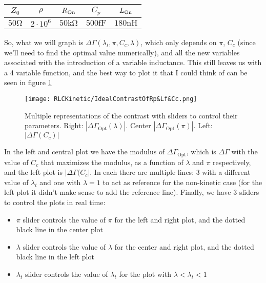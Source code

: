 \documentclass[../main.tex]{subfiles}
\begin{document}
\begin{table}[H]
    \centering
    \begin{tabular}{c|c|c|c|c}
        \(Z_{0}\) & \(\rho\) & \(R_{\text{On}}\) & \(C_{p}\) & \(L_{\text{On}}\) \\\hline
        \(50\unit{\ohm}\) & \(2\cdot10^{6}\) & \(50\unit{\kilo\ohm}\) & \(500\unit{\femto\farad}\) & \(180\unit{\nano\henry}\)
    \end{tabular}
\end{table}

So, what we will graph is \(\Delta\Gamma(\lambda_{t}, \pi, C_{c}, \lambda)\),
which only depends on \(\pi\), \(C_{c}\) (since we'll need to find the optimal
value numerically), and all the new variables associated with the introduction
of a variable inductance. This still leaves us with a 4 variable function, and
the best way to plot it that I could think of can be seen in figure
\ref{fig:IdealContrast}

\begin{figure}[t]
\centering
  \texttt{[image: RLCKinetic/IdealContrastOfRp\&Lf\&Cc.png]}
  \caption{Multiple representations of the contrast with sliders to control
  their parameters. Right: \(|\Delta\Gamma_{\text{Opt}}(\lambda)|\).
  Center \(|\Delta\Gamma_{\text{Opt}}(\pi)|\). Left: \(|\Delta\Gamma(C_{c})|\)}
\label{fig:IdealContrast}
\end{figure}

In the left and central plot we have the modulus of \(\Delta\Gamma_{\text{Opt}}\),
which is \(\Delta\Gamma\) with the value of \(C_{c}\) that maximizes the modulus,
as a function of \(\lambda\) and \(\pi\) respectively, and the left plot
is \(|\Delta\Gamma(C_{c}|\). In each there are multiple lines: 3 with a different
value of \(\lambda_{t}\) and one with \(\lambda = 1\) to act as reference for
the non-kinetic case (for the left plot it didn't make sense to add the reference
line). Finally, we have 3 sliders to control the plots in real time:

\begin{itemize}
    \item \(\pi\) slider controls the value of \(\pi\) for the left and right
        plot, and the dotted black line in the center plot
    \item \(\lambda\) slider controls the value of \(\lambda\) for the center
        and right plot, and the dotted black line in the left plot
    \item \(\lambda_{t}\) slider controls the value of \(\lambda_{t}\) for
        the plot with \(\lambda < \lambda_{t} < 1\)
\end{itemize}
\end{document}
